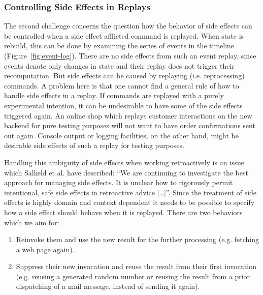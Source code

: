 \subsubsection{Controlling Side Effects in Replays}
\label{sec:replaying-se}
The second challenge concerns the question how the behavior of side effects 
can be controlled when a side effect afflicted command is replayed.
%
When state is rebuild, this can be done by examining the series of events
in the timeline (Figure~\ref{fig:event-log}).
There are no side effects from such an event replay, since events denote only 
changes in state and their replay does not trigger their recomputation. 
But side effects can be caused by replaying (i.e. reprocessing) commands. 
A problem here is that one cannot find a general rule of how to handle
side effects in a replay. If commands are replayed with a purely
experimental intention, it can be undesirable to have some of the side effects 
triggered again.
An online shop which replays customer interactions on the new backend for pure 
testing purposes will not want to have order confirmations sent out again.
Console output or logging facilities, on the other hand, might be desirable
side effects of such a replay for testing purposes.

Handling this ambiguity of side effects when working retroactively is an issue 
which Salkeld et al. \cite{Salkeld2011} have described: 
``We are continuing to investigate the best approach for managing side effects. 
It is unclear how to rigorously permit intentional, safe side effects in 
retroactive advice [\dots]''.
Since the treatment of side effects is highly domain and context dependent
it needs to be possible to specify how a side effect should behave when it is 
replayed. There are two behaviors which we aim for:

\begin{enumerate}
	\item Reinvoke them and use the new result for the further processing
	(e.g. fetching a web page again).
	\item Suppress their new invocation and reuse the result from their 
	first invocation (e.g. reusing a generated random number or reusing 
	the result from a prior dispatching of a mail message, instead of sending 
	it again).
\end{enumerate}

